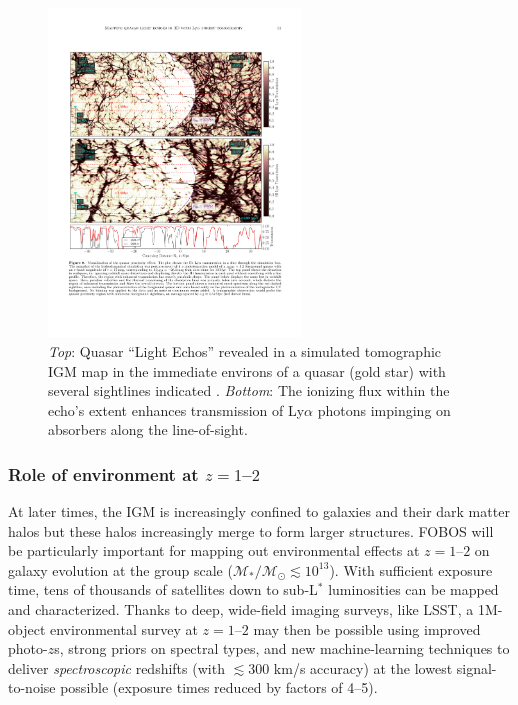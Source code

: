 \begin{figure}
%
\includegraphics[width=0.6\textwidth]{figs/qso_LightEcho_v1.pdf}
%
\caption{{\it Top}: Quasar ``Light Echos'' revealed in a simulated
tomographic IGM map in the immediate environs of a quasar (gold star)
with several sightlines indicated
\citep[from][]{2018arXiv181005156S}. {\it Bottom}: The ionizing flux
within the echo's extent enhances transmission of Ly$\alpha$ photons
impinging on absorbers along the line-of-sight.}
\label{fig:LightEcho}
\end{figure}

\subsubsection{Role of environment at $z=1$--$2$ }

At later times, the IGM is increasingly confined to galaxies and their dark matter halos but these halos increasingly
merge to form larger structures.  FOBOS will be particularly important for mapping out environmental effects at
$z=1$--$2$ on galaxy evolution at the group scale ($\mathcal{M_\ast/M_\odot} \lesssim 10^{13}$).  With sufficient
exposure time, tens of thousands of satellites down to sub-L$^*$ luminosities can be mapped and characterized. Thanks
to deep, wide-field imaging surveys, like LSST, a 1M-object environmental survey at $z=1$--$2$ may then be possible
using improved photo-$z$s, strong priors on spectral types, and new machine-learning techniques to deliver {\it
spectroscopic} redshifts (with $\lesssim$300 km/s accuracy) at the lowest signal-to-noise possible (exposure times
reduced by factors of 4--5).

